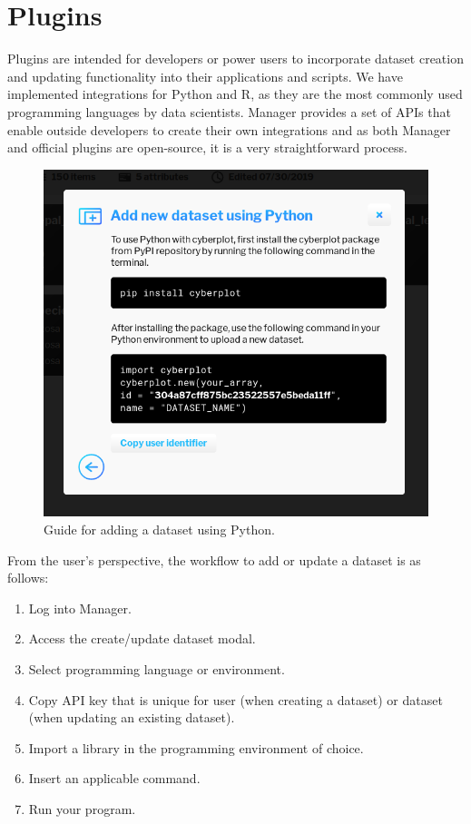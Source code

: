 \documentclass[thesis=M,english,hidelinks]{FITthesisXE}[2012/06/26]
\begin{document}
\chapter{Plugins}

Plugins are intended for developers or power users to incorporate dataset creation and updating functionality into their applications and scripts. We have implemented integrations for Python and R, as they are the most commonly used programming languages by data scientists. Manager provides a set of APIs that enable outside developers to create their own integrations and as both Manager and official plugins are open-source\autocite{github}, it is a very straightforward process.

\begin{figure}[ht]
\centering
\includegraphics[scale=0.4]{manager_python}
\caption{Guide for adding a dataset using Python.}
\label{fig:manager_python}
\end{figure}

From the user's perspective, the workflow to add or update a dataset is as follows:

\begin{enumerate}
\item Log into Manager.
\item Access the create/update dataset modal.
\item Select programming language or environment.
\item Copy API key that is unique for user (when creating a dataset) or dataset (when updating an existing dataset).
\item Import a library in the programming environment of choice.
\item Insert an applicable command.
\item Run your program.
\end{enumerate}
\end{document}

